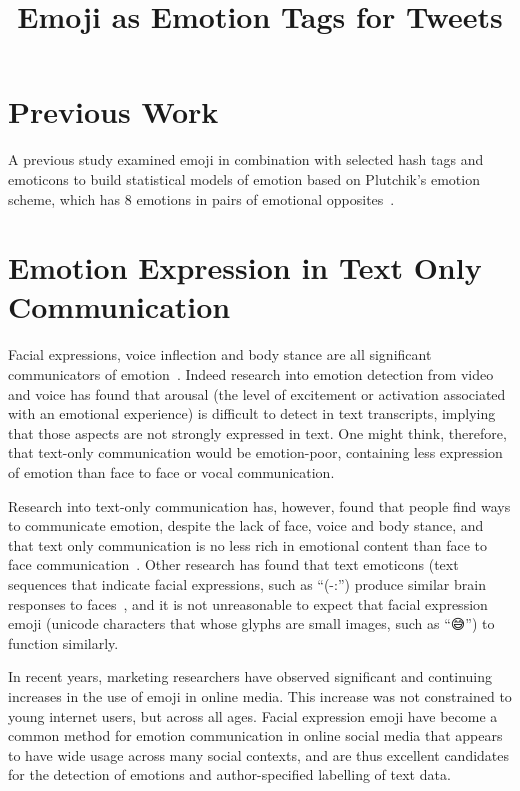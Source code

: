 \documentclass[10pt, a4paper]{article}
\title{Emoji as Emotion Tags for Tweets}
\begin{document}
\maketitleabstract

\section{Previous Work}
A previous study examined emoji in combination with selected hash tags and emoticons to build statistical models of emotion based on Plutchik's emotion scheme, which has 8 emotions in pairs of emotional opposites~\cite{Suttles2013Distant}. 

\section{Emotion Expression in Text Only Communication}
\label{sec:emotion_expression_in_text_only_communication}
Facial expressions, voice inflection and body stance are all significant communicators of emotion~\cite{Johnston2015Apa}. 
Indeed research into emotion detection from video and voice has found that arousal (the level of excitement or activation associated with an emotional experience) is 
difficult to detect in text transcripts, implying that those aspects are not strongly expressed in text.
One might think, therefore, that text-only communication would be emotion-poor, containing less expression of emotion than face to face or vocal communication.

Research into text-only communication has, however, found that people find ways to communicate emotion, despite the lack of face, voice and body stance, and that text only communication is no less rich in emotional content than face to face communication~\cite{Derks2008Role}.
Other research has found that text emoticons (text sequences that indicate facial expressions, such as ``(-:'') produce similar brain responses to faces~\cite{Churches2014Emoticons}, and it is not unreasonable to expect that facial expression emoji (unicode characters that whose glyphs are small images, such as ``😅'') to function similarly.

In recent years, marketing researchers have observed significant and continuing increases in the use of emoji in online media. This increase was not constrained to young internet users, but across all ages. 
Facial expression emoji have become a common method for emotion communication in online social media that appears to have wide usage across many social contexts, and are thus excellent candidates for the detection of emotions and author-specified labelling of text data.
\end{document}
